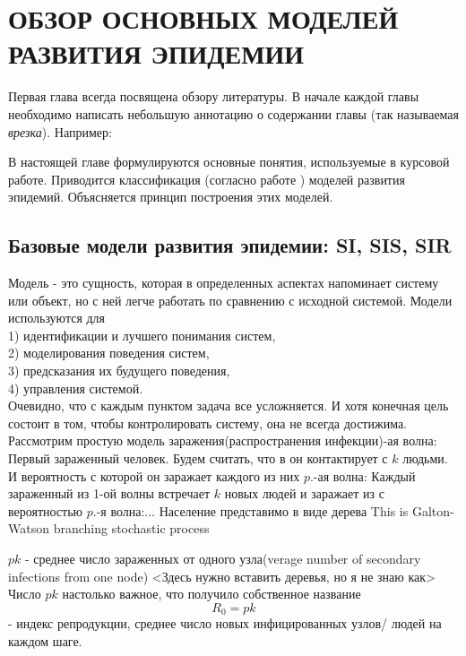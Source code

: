 \chapter{ОБЗОР ОСНОВНЫХ МОДЕЛЕЙ РАЗВИТИЯ ЭПИДЕМИИ}\label{chap1} %

Первая глава всегда посвящена обзору литературы. В начале каждой главы необходимо написать небольшую аннотацию о содержании главы (так называемая \textit{врезка}). Например:

В настоящей главе формулируются основные понятия, используемые в курсовой работе. Приводится классификация (согласно работе \cite{GabasovKirillovaPU}) моделей развития эпидемий. Объясняется принцип построения этих моделей\cite{GabasovDmitrukKirillova15a}.

\section{Базовые модели развития эпидемии: SI, SIS, SIR}\label{1sec:basic-models}
Модель - это сущность, которая в определенных аспектах напоминает систему или объект, но с ней легче работать по сравнению с исходной системой. Модели используются для\\
1) идентификации и лучшего понимания систем,\\
2) моделирования поведения систем,\\
3) предсказания их будущего поведения,\\
4) управления системой.\\
Очевидно, что с каждым пунктом задача все усложняется. И хотя конечная цель состоит в том, чтобы контролировать систему, она не всегда достижима.
Рассмотрим простую модель заражения(распространения инфекции)-ая волна: Первый зараженный человек. Будем считать, что в он контактирует с $k$ людьми. И вероятность с которой он заражает каждого из них $p$.-ая волна: Каждый зараженный из 1-ой волны встречает $k$ новых людей и заражает из с вероятностью $p$.-я волна:...
Население представимо в виде дерева
This is Galton-Watson branching stochastic process

$pk$ - среднее число зараженных от одного узла(verage number of secondary infections from one node)
<Здесь нужно вставить деревья, но я не знаю как>
Число $pk$ настолько важное, что получило собственное название
\begin{equation}
R_0=pk\end{equation}
- индекс репродукции, среднее число новых инфицированных узлов/ людей на каждом шаге.

